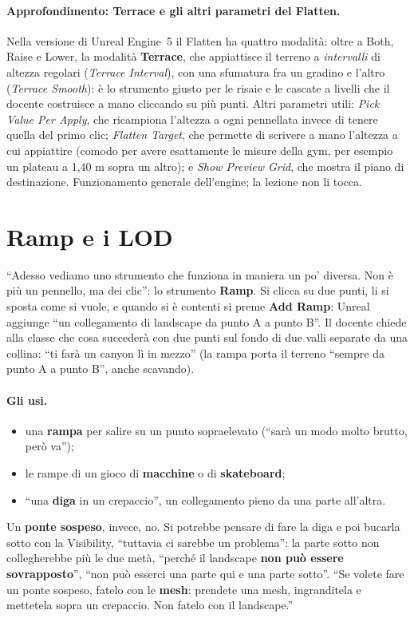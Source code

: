 \paragraph{Approfondimento: Terrace e gli altri parametri del Flatten.} Nella versione di
Unreal Engine~5 il Flatten ha quattro modalità: oltre a Both, Raise e Lower, la modalità
\textbf{Terrace}, che appiattisce il terreno a \emph{intervalli} di altezza regolari
(\emph{Terrace Interval}), con una sfumatura fra un gradino e l'altro (\emph{Terrace
Smooth}): è lo strumento giusto per le risaie e le cascate a livelli che il docente
costruisce a mano cliccando su più punti. Altri parametri utili: \emph{Pick Value Per
Apply}, che ricampiona l'altezza a ogni pennellata invece di tenere quella del primo clic;
\emph{Flatten Target}, che permette di scrivere a mano l'altezza a cui appiattire (comodo
per avere esattamente le misure della gym, per esempio un plateau a 1,40 m sopra un
altro); e \emph{Show Preview Grid}, che mostra il piano di destinazione. Funzionamento
generale dell'engine; la lezione non li tocca.

\section{Ramp e i LOD}
\label{ue14:sec:ramp}

``Adesso vediamo uno strumento che funziona in maniera un po' diversa. Non è più un
pennello, ma dei clic'': lo strumento \textbf{Ramp}. Si clicca su due punti, li si sposta
come si vuole, e quando si è contenti si preme \textbf{Add Ramp}: Unreal aggiunge ``un
collegamento di landscape da punto A a punto B''. Il docente chiede alla classe che cosa
succederà con due punti sul fondo di due valli separate da una collina: ``ti farà un canyon
lì in mezzo'' (la rampa porta il terreno ``sempre da punto A a punto B'', anche scavando).

\paragraph{Gli usi.}
\begin{itemize}
  \item una \textbf{rampa} per salire su un punto sopraelevato (``sarà un modo molto brutto,
        però va'');
  \item le rampe di un gioco di \textbf{macchine} o di \textbf{skateboard};
  \item ``una \textbf{diga} in un crepaccio'', un collegamento pieno da una parte all'altra.
\end{itemize}
Un \textbf{ponte sospeso}, invece, no. Si potrebbe pensare di fare la diga e poi bucarla
sotto con la Visibility, ``tuttavia ci sarebbe un problema'': la parte sotto non
collegherebbe più le due metà, ``perché il landscape \textbf{non può essere sovrapposto}'',
``non può esserci una parte qui e una parte sotto''. ``Se volete fare un ponte sospeso,
fatelo con le \textbf{mesh}: prendete una mesh, ingranditela e mettetela sopra un crepaccio.
Non fatelo con il landscape.''

